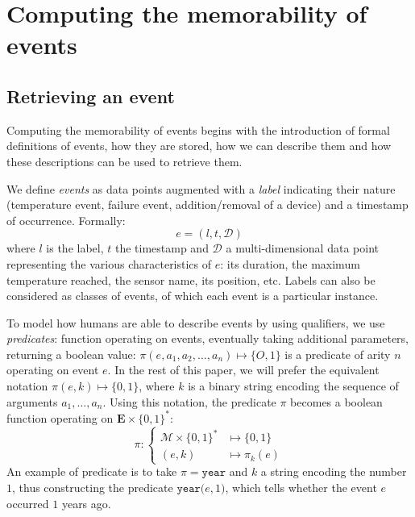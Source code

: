 \documentclass[conference]{IEEEtran}
\begin{document}
\section{Computing the memorability of events}
\label{sec:computing}
\subsection{Retrieving an event}

Computing the memorability of events begins with the introduction of formal definitions of events, how they are stored, how we can describe them and how these descriptions can be used to retrieve them.

We define \emph{events} as data points augmented with a \emph{label} indicating their nature (temperature event, failure event, addition/removal of a device) and a timestamp of occurrence. Formally:
\begin{equation}
  \label{eq:event}
  e = (l, t,\mathcal{D})
\end{equation}
where $l$ is the label, $t$ the timestamp and $\mathcal{D}$ a multi-dimensional data point representing the various characteristics of $e$: its duration, the maximum temperature reached, the sensor name, its position, etc. Labels can also be considered as classes of events, of which each event is a particular instance.

To model how humans are able to describe events by using qualifiers, we use \emph{predicates}: function operating on events, eventually taking additional parameters, returning a boolean value: $\pi(e, a_1, a_2, \dots, a_n) \mapsto \{O,1\}$ is a predicate of arity $n$ operating on event $e$. In the rest of this paper, we will prefer the equivalent notation $\pi(e, k) \mapsto \{0,1\}$, where $k$ is a binary string encoding the sequence of arguments $a_1, \dots, a_n$. Using this notation, the predicate $\pi$ becomes a boolean function operating on $\mathbf{E} \times \{0,1\}^*$:
\begin{equation}
  \label{eq:predicate}
  \pi : \begin{cases}
    \mathcal{M}\times \{0,1\}^{*} & \mapsto \{0,1\}    \\
    (e, k)                        & \mapsto \pi_{k}(e)
  \end{cases}
\end{equation}
An example of predicate is to take $\pi = \mathtt{year}$ and $k$ a string encoding the number $1$, thus
constructing the predicate $\mathtt{year(}e, 1\mathtt{)}$, which tells whether
the event $e$ occurred $1$ years ago.
\end{document}
